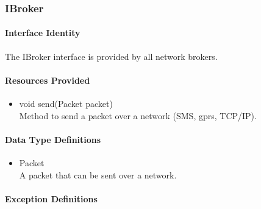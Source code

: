 \subsubsection{IBroker}
\paragraph{Interface Identity}
The IBroker interface is provided by all network brokers.
\paragraph{Resources Provided}
\begin{itemize}
	\item{void send(Packet packet)}\\
	Method to send a packet over a network (SMS, gprs, TCP/IP).
\end{itemize}
\paragraph{Data Type Definitions}
\begin{itemize}
	\item Packet\\
	A packet that can be sent over a network.
\end{itemize}
\paragraph{Exception Definitions}
